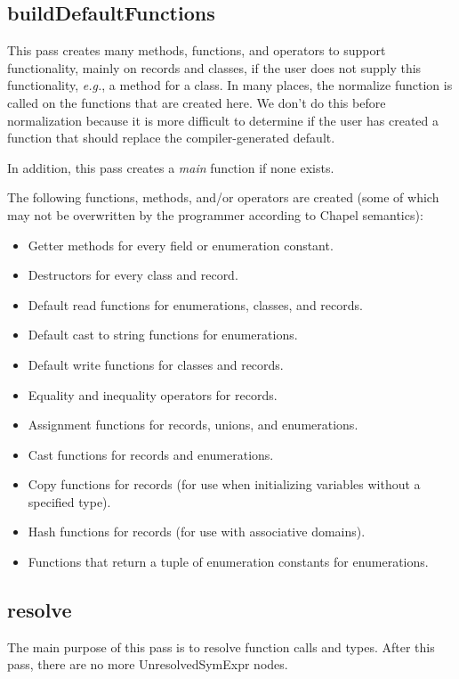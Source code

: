 \documentclass[10pt]{article}
\newcommand{\eg}{\emph{e.g.}}
\begin{document}
\subsection{buildDefaultFunctions}

This pass creates many methods, functions, and operators to support
functionality, mainly on records and classes, if the user does not
supply this functionality, \eg, a  method for a class.
In many places, the normalize function is called on the functions that
are created here.  We don't do this before normalization because it is
more difficult to determine if the user has created a function that
should replace the compiler-generated default.

In addition, this pass creates a \emph{main} function if none exists.

The following functions, methods, and/or operators are created (some
of which may not be overwritten by the programmer according to Chapel
semantics):
\begin{itemize}
\item Getter methods for every field or enumeration constant.
\item Destructors for every class and record.
\item Default read functions for enumerations, classes, and records.
\item Default cast to string functions for enumerations.
\item Default write functions for classes and records.
\item Equality and inequality operators for records.
\item Assignment functions for records, unions, and enumerations.
\item Cast functions for records and enumerations.
\item Copy functions for records (for use when initializing variables
  without a specified type).
\item Hash functions for records (for use with associative domains).
\item Functions that return a tuple of enumeration constants for
  enumerations.
\end{itemize}

\subsection{resolve}

The main purpose of this pass is to resolve function calls and types.
After this pass, there are no more UnresolvedSymExpr nodes.
\end{document}
